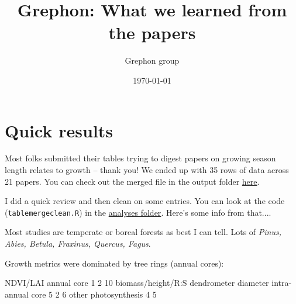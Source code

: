 \documentclass[11pt]{article}
\begin{document}
\renewcommand{\refname}{\CHead{}}

\title{Grephon: What we learned from the papers}
\date{\today}
\author{Grephon group} 
\maketitle

\tableofcontents

\section{Quick results}

Most folks submitted their tables trying to digest papers on growing season length relates to growth -- thank you! We ended up with 35 rows of data across 21 papers. You can check out the merged file in the output folder \href{https://github.com/lizzieinvancouver/grephon/tree/main/analyses}{here}.

I did a quick review and then clean on some entries. You can look at the code (\verb|tablemergeclean.R|) in the \href{https://github.com/lizzieinvancouver/grephon/tree/main/analyses}{analyses folder}. Here's some info from that....

Most studies are temperate or boreal forests as best I can tell. Lots of \emph{Pinus, Abies, Betula, Fraxinus, Quercus, Fagus}.

Growth metrics were dominated by tree rings (annual cores):
\begin{Schunk}
\begin{Soutput}
                                 NDVI/LAI          annual core 
                   1                    2                   10 
  biomass/height/R:S dendrometer diameter    intra-annual core 
                   5                    2                    6 
               other       photosynthesis 
                   4                    5 
\end{Soutput}
\end{Schunk}
\end{document}
